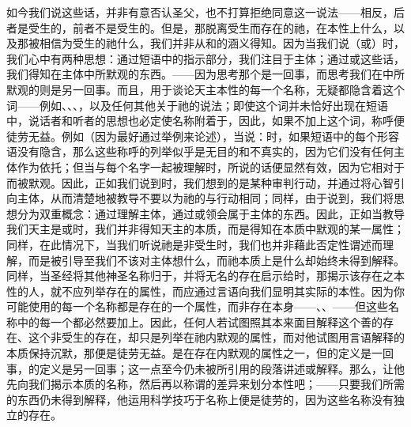 如今我们说这些话，并非有意否认圣父，也不打算拒绝同意这一说法——相反，后者是受生的，前者不是受生的。但是，那脱离受生而存在的祂，在本性上什么，以及那被相信为受生的祂什么，我们并非从和的涵义得知。因为当我们说（或）时，我们心中有两种思想：通过短语中的指示部分，我们注目于主体；通过或这些话，我们得知在主体中所默观的东西。——因为思考那个是一回事，而思考我们在中所默观的则是另一回事。而且，用于谈论天主本性的每一个名称，无疑都隐含着这个词——例如、、、，以及任何其他关于祂的说法；即使这个词并未恰好出现在短语中，说话者和听者的思想也必定使名称附着于，因此，如果不加上这个词，称呼便徒劳无益。例如（因为最好通过举例来论述），当说：时，如果短语中的每个形容语没有隐含，那么这些称呼的列举似乎是无目的和不真实的，因为它们没有任何主体作为依托；但当与每个名字一起被理解时，所说的话便显然有效，因为它相对于而被默观。因此，正如我们说到时，我们想到的是某种审判行动，并通过将心智引向主体，从而清楚地被教导不要以为祂的与行动相同；同样，由于说到，我们将思想分为双重概念：通过理解主体，通过或领会属于主体的东西。因此，正如当教导我们天主是或时，我们并非得知天主的本质，而是得知在本质中默观的某一属性；同样，在此情况下，当我们听说祂是非受生时，我们也并非藉此否定性谓述而理解，而是被引导至我们不该对主体想什么，而祂本质上是什么却始终未得到解释。同样，当圣经将其他神圣名称归于，并将无名的存在启示给时，那揭示该存在之本性的人，就不应列举存在的属性，而应通过言语向我们显明其实际的本性。因为你可能使用的每一个名称都是存在的一个属性，而非存在本身——、、——但这些名称中的每一个都必然要加上。因此，任何人若试图照其本来面目解释这个善的存在、这个非受生的存在，却只是列举在祂内默观的属性，而对他试图用言语解释的本质保持沉默，那便是徒劳无益。是在存在内默观的属性之一，但的定义是一回事，的定义是另一回事；这一点至今仍未被所引用的段落讲述或解释。那么，让他先向我们揭示本质的名称，然后再以称谓的差异来划分本性吧；——只要我们所需的东西仍未得到解释，他运用科学技巧于名称上便是徒劳的，因为这些名称没有独立的存在。\par

